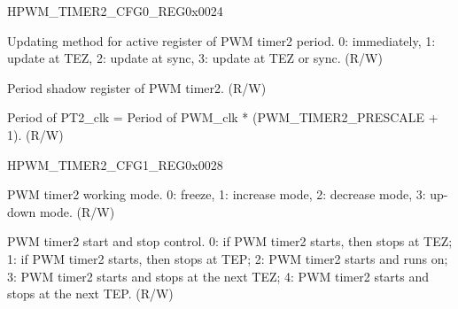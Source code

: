 \begin{register}{H}{PWM\_TIMER2\_CFG0\_REG}{0x0024}\label{regdesc:PWMTIMER2CFG0REG}
%
%
%
%
\regnewline%
\begin{regdesc}\begin{reglist}
\item [PWM\_TIMER2\_PERIOD\_UPMETHOD]Updating method for active register of PWM timer2 period. 0: immediately, 1: update at TEZ, 2: update at sync, 3: update at TEZ or sync. (R/W)
\label{regdesc:PWMTIMER2PERIOD} \item [PWM\_TIMER2\_PERIOD]Period shadow register of PWM timer2. (R/W)
\item [PWM\_TIMER2\_PRESCALE]Period of PT2\_clk = Period of PWM\_clk * (PWM\_TIMER2\_PRESCALE + 1). (R/W)
\end{reglist}\end{regdesc}
\end{register}

\begin{register}{H}{PWM\_TIMER2\_CFG1\_REG}{0x0028}\label{regdesc:PWMTIMER2CFG1REG}
%
%
%
\regnewline%
\begin{regdesc}\begin{reglist}
\item [PWM\_TIMER2\_MOD]PWM timer2 working mode. 0: freeze, 1: increase mode, 2: decrease mode, 3: up-down mode. (R/W)
\item [PWM\_TIMER2\_START]PWM timer2 start and stop control. 0: if PWM timer2 starts, then stops at TEZ; 1: if PWM timer2 starts, then stops at TEP; 2: PWM timer2 starts and runs on; 3: PWM timer2 starts and stops at the next TEZ; 4: PWM timer2 starts and stops at the next TEP. (R/W)
\end{reglist}\end{regdesc}
\end{register}


